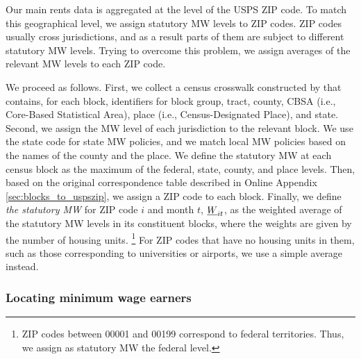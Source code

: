 Our main rents data is aggregated at the level of the USPS ZIP code.
To match this geographical level, we assign statutory MW levels to ZIP codes.
ZIP codes usually cross jurisdictions, and as a result parts of them are subject
to different statutory MW levels.
Trying to overcome this problem, we assign averages of the relevant MW levels to
each ZIP code.

We proceed as follows.
First, we collect a census crosswalk constructed by \textcite{CensusLODES} that 
contains, for each block, identifiers for block group, tract, county, CBSA 
(i.e., Core-Based Statistical Area), place (i.e., Census-Designated Place), and 
state.
Second, we assign the MW level of each jurisdiction to the relevant block.
We use the state code for state MW policies, and we match local MW policies 
based on the names of the county and the place.
We define the statutory MW at each census block as the maximum of the federal,
state, county, and place levels.
Then, based on the original correspondence table described in Online Appendix 
\ref{sec:blocks_to_uspszip}, we assign a ZIP code to each block.
Finally, we define \textit{the statutory MW} for ZIP code $i$ and month $t$, 
$\underline{W}_{it}$, as the weighted average of the statutory MW levels in its
constituent blocks, where the weights are given by the number of housing 
units.%
\footnote{ZIP codes between 00001 and 00199 correspond to federal territories.
Thus, we assign as statutory MW the federal level.}
For ZIP codes that have no housing units in them, such as those corresponding to 
universities or airports, we use a simple average instead.

\subsubsection*{Locating minimum wage earners}

